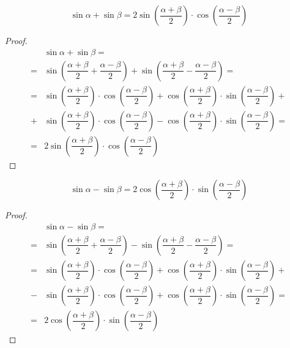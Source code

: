 \documentclass[12pt]{article}
\begin{document}
    \begin{statement}
        $$\sin\alpha+\sin\beta=2\sin\left(\dfrac{\alpha+\beta}{2}\right)\cdot\cos\left(\dfrac{\alpha-\beta}{2}\right)$$
    \end{statement}
    \begin{proof}
        \begin{align*}
            &\sin\alpha+\sin\beta=\\
            =&\sin\left(\dfrac{\alpha+\beta}{2}+\dfrac{\alpha-\beta}{2}\right)+\sin\left(\dfrac{\alpha+\beta}{2}-\dfrac{\alpha-\beta}{2}\right)=\\
            =&\sin\left(\dfrac{\alpha+\beta}{2}\right)\cdot\cos\left(\dfrac{\alpha-\beta}{2}\right)+\cos\left(\dfrac{\alpha+\beta}{2}\right)\cdot\sin\left(\dfrac{\alpha-\beta}{2}\right)+\\
            +&\sin\left(\dfrac{\alpha+\beta}{2}\right)\cdot\cos\left(\dfrac{\alpha-\beta}{2}\right)-\cos\left(\dfrac{\alpha+\beta}{2}\right)\cdot\sin\left(\dfrac{\alpha-\beta}{2}\right)=\\
            =&2\sin\left(\dfrac{\alpha+\beta}{2}\right)\cdot\cos\left(\dfrac{\alpha-\beta}{2}\right)
        \end{align*}
    \end{proof}
    \begin{statement}
        $$\sin\alpha-\sin\beta=2\cos\left(\dfrac{\alpha+\beta}{2}\right)\cdot\sin\left(\dfrac{\alpha-\beta}{2}\right)$$
    \end{statement}
    \begin{proof}
        \begin{align*}
            &\sin\alpha-\sin\beta=\\
            =&\sin\left(\dfrac{\alpha+\beta}{2}+\dfrac{\alpha-\beta}{2}\right)-\sin\left(\dfrac{\alpha+\beta}{2}-\dfrac{\alpha-\beta}{2}\right)=\\
            =&\sin\left(\dfrac{\alpha+\beta}{2}\right)\cdot\cos\left(\dfrac{\alpha-\beta}{2}\right)+\cos\left(\dfrac{\alpha+\beta}{2}\right)\cdot\sin\left(\dfrac{\alpha-\beta}{2}\right)+\\
            -&\sin\left(\dfrac{\alpha+\beta}{2}\right)\cdot\cos\left(\dfrac{\alpha-\beta}{2}\right)+\cos\left(\dfrac{\alpha+\beta}{2}\right)\cdot\sin\left(\dfrac{\alpha-\beta}{2}\right)=\\
            =&2\cos\left(\dfrac{\alpha+\beta}{2}\right)\cdot\sin\left(\dfrac{\alpha-\beta}{2}\right)
        \end{align*}
    \end{proof}
\end{document}
